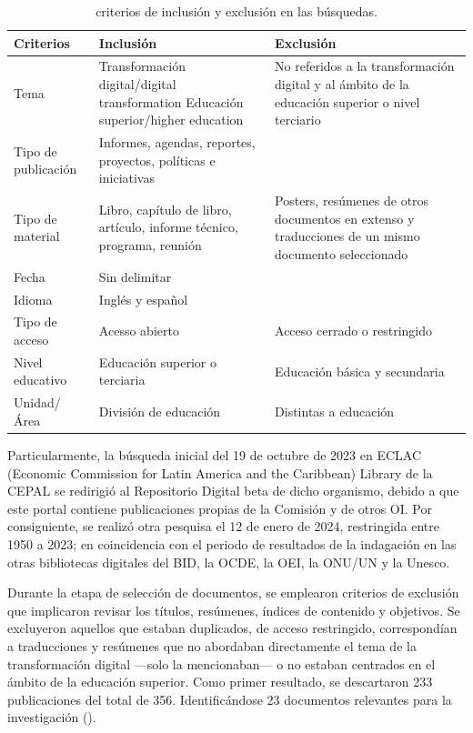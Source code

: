 \begin{table}[htpb]
    \centering
    \small
    \caption{criterios de inclusión y exclusión en las búsquedas.}
    \label{tab-03}
    \begin{tabular}{
    >{\raggedright\arraybackslash}p{}
    >{\raggedright\arraybackslash}p{}
    >{\raggedright\arraybackslash}p{}
    }
        \toprule
        Criterios & Inclusión & Exclusión \\
        \midrule
        Tema & Transformación digital/digital transformation
        Educación superior/higher education &
        No referidos a la transformación digital y al ámbito de la educación superior o nivel terciario \\
        Tipo de publicación & Informes, agendas, reportes, proyectos, políticas e iniciativas & \\
        Tipo de material & Libro, capítulo de libro, artículo, informe técnico, programa, reunión & Posters, resúmenes de otros documentos en extenso y traducciones de un mismo documento seleccionado \\
        Fecha & Sin delimitar & \\
        Idioma & Inglés y español & \\
        Tipo de acceso & Acesso abierto & Acceso cerrado o restringido \\
        Nivel educativo & Educación superior o terciaria & Educación básica y secundaria \\
        Unidad/Área & División de educación & Distintas a educación\\
        \bottomrule
    \end{tabular}
\end{table}

Particularmente, la búsqueda inicial del 19 de octubre de 2023 en ECLAC
(Economic Commission for Latin America and the Caribbean) Library de la
CEPAL se redirigió al Repositorio Digital beta de dicho organismo,
debido a que este portal contiene publicaciones propias de la Comisión y
de otros OI. Por consiguiente, se realizó otra pesquisa el 12 de enero
de 2024, restringida entre 1950 a 2023; en coincidencia con el periodo
de resultados de la indagación en las otras bibliotecas digitales del
BID, la OCDE, la OEI, la ONU/UN y la Unesco.

Durante la etapa de selección de documentos, se emplearon criterios de
exclusión que implicaron revisar los títulos, resúmenes, índices de
contenido y objetivos. Se excluyeron aquellos que estaban duplicados, de
acceso restringido, correspondían a traducciones y resúmenes que no
abordaban directamente el tema de la transformación digital ---solo la
mencionaban--- o no estaban centrados en el ámbito de la educación
superior. Como primer resultado, se descartaron 233 publicaciones del
total de 356. Identificándose 23 documentos relevantes para la
investigación ().

